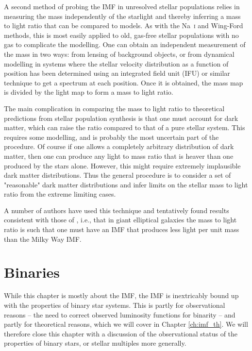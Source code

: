 A second method of probing the IMF in unresolved stellar populations relies in measuring the mass independently of the starlight and thereby inferring a mass to light ratio that can be compared to models. As with the Na~\textsc{i} and Wing-Ford methods, this is most easily applied to old, gas-free stellar populations with no gas to complicate the modelling. One can obtain an independent measurement of the mass in two ways: from lensing of background objects, or from dynamical modelling in systems where the stellar velocity distribution as a function of position has been determined using an integrated field unit (IFU) or similar technique to get a spectrum at each position. Once it is obtained, the mass map is divided by the light map to form a mass to light ratio.

The main complication in comparing the mass to light ratio to theoretical predictions from stellar population synthesis is that one must account for dark matter, which can raise the ratio compared to that of a pure stellar system. This requires some modelling, and is probably the most uncertain part of the procedure. Of course if one allows a completely arbitrary distribution of dark matter, then one can produce any light to mass ratio that is heaver than one produced by the stars alone. However, this might require extremely implausible dark matter distributions. Thus the general procedure is to consider a set of "reasonable" dark matter distributions and infer limits on the stellar mass to light ratio from the extreme limiting cases.

A number of authors have used this technique \citep[e.g.,][]{cappellari12a} and tentatively found results consistent with those of \citet{van-dokkum10a}, i.e., that in giant elliptical galaxies the mass to light ratio is such that one must have an IMF that produces less light per unit mass than the Milky Way IMF.

\section{Binaries}

While this chapter is mostly about the IMF, the IMF is inextricably bound up with the properties of binary star systems. This is partly for observational reasons -- the need to correct observed luminosity functions for binarity -- and partly for theoretical reasons, which we will cover in Chapter \ref{ch:imf_th}. We will therefore close this chapter with a discussion of the observational status of the properties of binary stars, or stellar multiples more generally.

